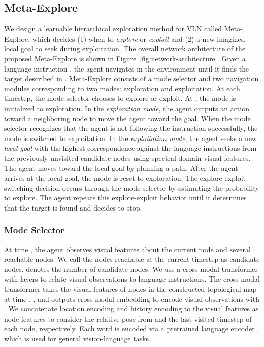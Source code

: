 \documentclass[10pt,twocolumn,letterpaper]{article}
\begin{document}
\subsection{Meta-Explore}
\vspace{-0.15cm}
\font=2.0pt
We design a learnable hierarchical exploration method for VLN called Meta-Explore, which decides (1) when to \textit{explore} or \textit{exploit} and (2) a new imagined local goal to seek during exploitation. The overall network architecture of the proposed Meta-Explore is shown in Figure~\ref{fig:network-architecture}. Given a language instruction , the agent navigates in the environment until it finds the target described in . Meta-Explore consists of a mode selector and two navigation modules corresponding to two modes: exploration and exploitation. At each timestep, the mode selector chooses to explore or exploit. At , the mode is initialized to exploration. In the \textit{exploration mode}, the agent outputs an action toward a neighboring node to move the agent toward the goal. When the mode selector recognizes that the agent is not following the instruction successfully, the mode is switched to exploitation. In the \textit{exploitation mode}, the agent seeks a new \textit{local goal} with the highest correspondence against the language instructions from the previously unvisited candidate nodes using spectral-domain visual features. The agent moves toward the local goal by planning a path. After the agent arrives at the local goal, the mode is reset to exploration. The explore-exploit switching decision occurs through the mode selector by estimating the probability to explore. The agent repeats this explore-exploit behavior until it determines that the target is found and decides to stop.
\vspace{-0.4cm}

\subsubsection{Mode Selector}
\vspace{-0.2cm}
\font=2.2pt
At time , the agent observes visual features about the current node  and several reachable nodes. We call the nodes reachable at the current timestep as candidate nodes.  denotes the number of candidate nodes.
We use a cross-modal transformer with  layers to relate visual observations to language instructions. The cross-modal transformer takes the visual features of nodes in the constructed topological map at time , , and outputs cross-modal embedding  to encode visual observations with . We concatenate location encoding and history encoding \cite{chen2022think} to the visual features as node features to consider the relative pose from  and the last visited timestep of each node, respectively. Each word is encoded via a pretrained language encoder \cite{tan2019lxmert}, which is used for general vision-language tasks. 
\end{document}
